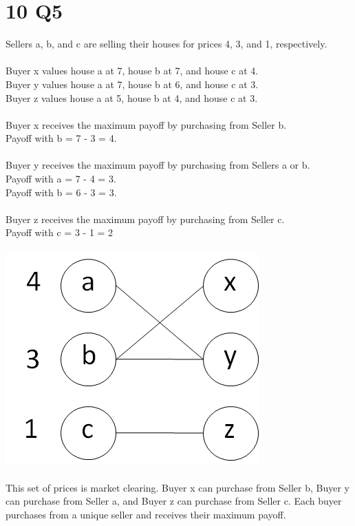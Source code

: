 \documentclass{article}
\begin{document}
\section{10 Q5}

Sellers a, b, and c are selling their houses for prices 4, 3, and 1, respectively.\\\\
Buyer x values house a at 7, house b at 7, and house c at 4.\\
Buyer y values house a at 7, house b at 6, and house c at 3.\\
Buyer z values house a at 5, house b at 4, and house c at 3.\\
\\
Buyer x receives the maximum payoff by purchasing from Seller b.\\
\indent Payoff with b  = 7 - 3 = 4.\\\\
Buyer y receives the maximum payoff by purchasing from Sellers a or b.\\
\indent Payoff with a = 7 - 4 = 3.\\
\indent Payoff with b = 6 - 3 = 3.\\\\
Buyer z receives the maximum payoff by purchasing from Seller c.\\
\indent Payoff with c = 3 - 1 = 2\\\\
\includegraphics{bipartite_graph2.png}\\\\
This set of prices is market clearing. Buyer x can purchase from Seller b, Buyer y can purchase from Seller a, and Buyer z can purchase from Seller c.  Each buyer purchases from a unique seller and receives their maximum payoff.
\end{document}
